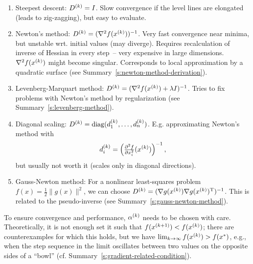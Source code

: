 \documentclass{article}
\begin{document}
\begin{enumerate}
\item Steepest descent: \(\kth{D} = I\).  Slow convergence if the level lines are elongated (leads
  to zig-zagging), but easy to evaluate.
\item Newton's method: \(\kth{D} = (\nabla^2 f(\kth{x}))^{-1}\).  Very fast convergence near minima,
  but unstable wrt. initial values (may diverge).  Requires recalculation of inverse of Hessian in
  every step~-- very expensive in large dimensions.  \(\nabla^2 f(\kth{x})\) might become singular.
  Corresponds to local approximation by a quadratic surface (see
  Summary~\ref{s:newton-method-derivation}).
\item Levenberg-Marquart method: \(\kth{D} = (\nabla^2 f(\kth{x}) + \lambda I)^{-1}\).  Tries
  to fix problems with Newton's method by regularization (see Summary~\ref{s:levenberg-method}).
\item Diagonal scaling: \(\kth{D} = \diag(\kth{d}_1, \ldots, \kth{d}_n)\). E.g. approximating
  Newton's method with
  \begin{equation*}
    \kth{d}_i = \left( \pd[2]{f}{x_i}(\kth{x}) \right)^{-1},
  \end{equation*}
  but usually not worth it (scales only in diagonal directions).
\item Gauss-Newton method: For a nonlinear least-squares problem
  \(f(x) = \frac{1}{2} \lVert g(x) \rVert^2\), we can choose
  \(\kth{D} = ( \nabla g(\kth{x}) \T{\nabla g(\kth{x})} )^{-1}\).  This is related to the
  pseudo-inverse (see Summary~\ref{s:gauss-newton-method}).
\end{enumerate}


\label{s:step-size-selection}

To ensure convergence and performance, \(\kth{\alpha}\) needs to be chosen with care.
Theoretically, it is not enough set it such that \(f(\kth[k+1]{x}) < f(\kth{x})\); there are
counterexamples for which this holds, but we have \(\lim_{k \to \infty} f(\kth{x}) > f(x^*)\), e.g.,
when the step sequence in the limit oscillates between two values on the opposite sides of a
``bowl'' (cf. Summary~\ref{s:gradient-related-condition}).
\end{document}
